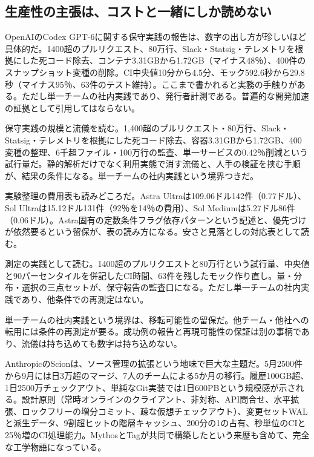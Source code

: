 \documentclass[lualatex,a4paper,10pt]{jlreq}
\begin{document}
\subsection*{生産性の主張は、コストと一緒にしか読めない}

OpenAIのCodex GPT-6に関する保守実践の報告は、数字の出し方が珍しいほど具体的だ。1400超のプルリクエスト、80万行、Slack・Statsig・テレメトリを根拠にした死コード除去、コンテナ3.31GBから1.72GB（マイナス48％）、400件のスナップショット変種の削除。CI中央値10分から4.5分、モック592.6秒から29.8秒（マイナス95％、63件のテスト維持）。ここまで書かれると実務の手触りがある。ただし単一チームの社内実践であり、発行者計測である。普遍的な開発加速の証拠として引用してはならない。
\cite{B31}


保守実践の規模と流儀を読む。1,400超のプルリクエスト・80万行、Slack・Statsig・テレメトリを根拠にした死コード除去、容器3.31GBから1.72GB、400変種の整理、6千超ファイル・100万行の監査、単一サービスの0.42％削減という試行量だ。静的解析だけでなく利用実態で消す流儀と、人手の検証を挟む手順が、結果の条件になる。単一チームの社内実践という境界つきだ。
\cite{B31}


実験整理の費用表も読みどころだ。Astra Ultraは109.06ドル142件（0.77ドル）、Sol Ultraは15.12ドル131件（92％を14％の費用）、Sol Mediumは5.27ドル86件（0.06ドル）。Astra固有の定数条件フラグ依存パターンという記述と、優先づけが依然要るという留保が、表の読み方になる。安さと見落としの対応表として読む。
\cite{B31}


測定の実践として読む。1400超のプルリクエストと80万行という試行量、中央値と90パーセンタイルを併記したCI時間、63件を残したモック作り直し。量・分布・選択の三点セットが、保守報告の監査口になる。ただし単一チームの社内実践であり、他条件での再測定はない。
\cite{B31}


単一チームの社内実践という境界は、移転可能性の留保だ。他チーム・他社への転用には条件の再測定が要る。成功例の報告と再現可能性の保証は別の事柄であり、流儀は持ち込めても数字は持ち込めない。
\cite{B31}


AnthropicのScionは、ソース管理の拡張という地味で巨大な主題だ。5月2500件から9月には日3万超のマージ、7人のチームによる5か月の移行。履歴100GB超、1日2500万チェックアウト、単純なGit実装では1日600PBという規模感が示される。設計原則（常時オンラインのクライアント、非対称、API問合せ、水平拡張、ロックフリーの増分コミット、疎な仮想チェックアウト）、変更セットWALと派生データ、9割超ヒットの階層キャッシュ、200分の1の占有、秒単位のCIと25％増のCI処理能力。MythosとTagが共同で構築したという来歴も含めて、完全な工学物語になっている。
\cite{B32,B75}
\end{document}
